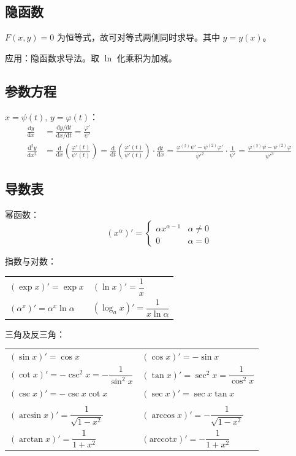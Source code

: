\documentclass[12pt, a4paper, UTF8, openany]{ctexbook}
\newcommand{\dif}{\mathrm{d}}
\begin{document}
        \subsection{隐函数}
        $F(x, y) = 0$ 为恒等式，故可对等式两侧同时求导。其中 $y = y(x)$。

        {\heiti 应用}：隐函数求导法。取 $\ln$ 化乘积为加减。

        \subsection{参数方程}
        $x = \psi(t), \, y = \varphi(t)$：
        $$\begin{aligned}
            \frac{\dif y}{\dif x} & = \frac{\dif y / \dif t}{\dif x / \dif t} = \frac{\varphi'}{\psi'} \\
            \frac{\dif^2 y}{\dif x^2} & = \frac{\dif}{\dif x}\left(\frac{\varphi'(t)}{\psi'(t)}\right) = 
            \frac{\dif}{\dif t}\left(\frac{\varphi'(t)}{\psi'(t)}\right) \cdot \frac{\dif t}{\dif x} 
            = \frac{\varphi^{(2)}\psi' - \psi^{(2)}\varphi'}{{\psi'}^2} \cdot \frac{1}{\psi'} 
            = \frac{\varphi^{(2)}\psi - \psi^{(2)}\varphi}{{\psi'}^3}
        \end{aligned}$$

        \subsection{导数表}
        幂函数：
        $$(x^\alpha)' = \begin{cases}
            \alpha x^{\alpha - 1} & \alpha \neq 0 \\
            0 & \alpha = 0
        \end{cases}$$

        指数与对数：
        \begin{longtable}[h]{*{2}{w{l}{8cm}}}
            $(\exp x)' = \exp x$ & $(\ln x)' = \dfrac{1}{x}$ \\
            $(\alpha^x)' = \alpha^x\ln\alpha$ & $(\log_{a}x)' = \dfrac{1}{x\ln\alpha}$
        \end{longtable}

        三角及反三角：
        \begin{longtable}[h]{*{2}{w{l}{8cm}}}
            $(\sin x)' = \cos x$ & $(\cos x)' = -\sin x$ \\
            $(\cot x)' = -\csc^2 x = -\dfrac{1}{\sin^2 x}$ & $(\tan x)' = \sec^2 x = \dfrac{1}{\cos^2 x}$ \\
            $(\csc x)' = -\csc x \cot x$ & $(\sec x)' = \sec x \tan x$ \\
            & \\
            $(\arcsin x)' = \dfrac{1}{\sqrt{1 - x^2}}$ & $(\arccos x)' = -\dfrac{1}{\sqrt{1 - x^2}}$ \\
            $(\arctan x)' = \dfrac{1}{1 + x^2}$ & $(\mathrm{arccot} x)' = -\dfrac{1}{1 + x^2}$
        \end{longtable}
\end{document}
